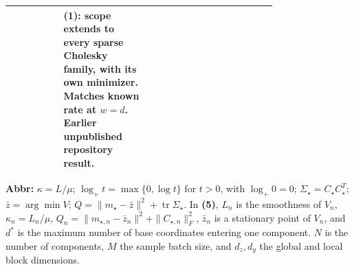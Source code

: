\begin{table}[tp]
\begin{threeparttable}
\begin{tabularx}{\linewidth}{@{}>{\raggedright\arraybackslash}p{0.20\linewidth}>{\raggedright\arraybackslash}p{0.32\linewidth}>{\raggedright\arraybackslash}p{0.25\linewidth}>{\raggedright\arraybackslash}X@{}}
& \textbf{(1)}: scope extends to every sparse Cholesky family, with its own minimizer. Matches known rate at $w=d$. Earlier unpublished repository result.
& \\
\bottomrule
\end{tabularx}
\begin{tablenotes}[flushleft]\footnotesize
\item[] \textbf{Abbr:} $\kappa=L/\mu$; $\log_+t=\max\{0,\log t\}$ for $t>0$, with $\log_+0=0$; $\Sigma_\star=C_\star C_\star^T$; $\bar z=\arg\min V$; $Q=\|m_\star-\bar z\|^2+\operatorname{tr}\Sigma_\star$. In \textbf{(5)}, $L_n$ is the smoothness of $V_n$, $\kappa_n=L_n/\mu$, $Q_n=\|m_{\star,n}-\bar z_n\|^2+\|C_{\star,n}\|_F^2$, $\bar z_n$ is a stationary point of $V_n$, and $d^*$ is the maximum number of base coordinates entering one component. $N$ is the number of components, $M$ the sample batch size, and $d_z,d_y$ the global and local block dimensions.
\end{tablenotes}
\end{threeparttable}
\end{table}
\clearpage
